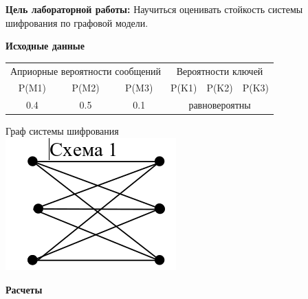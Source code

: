 \documentclass[a4paper,14pt]{extarticle}
\begin{document}
    \textbf{Цель лабораторной работы:}
    Научиться оценивать стойкость системы шифрования по графовой модели.

    \begin{center}
        \textbf{Исходные данные}
    \end{center}

    \begin{minipage}{.60\linewidth}
            \begin{tabular}{|c|c|c|c|c|c|}
                \hline
                \multicolumn{3}{|P{3.5cm}|}{Априорные вероятности сообщений} & \multicolumn{3}{|c|}{Вероятности ключей} \\
                \cline{1-6}
                P(M1) & P(M2) & P(M3) & P(K1) & P(K2) & P(K3)  \\
                \hline
                0.4 & 0.5 & 0.1 & \multicolumn{3}{c|}{равновероятны} \\
                \hline
            \end{tabular}
    \end{minipage}
    \begin{minipage}{.40\linewidth}
       \begin{center}
           Граф системы шифрования\\
            \vspace{1ex}
            \includegraphics[scale=0.5]{pics/graph_1.png}
       \end{center}
    \end{minipage}

    \vspace{1em}
    \begin{center}
        \textbf{Расчеты}
    \end{center}
\end{document}
